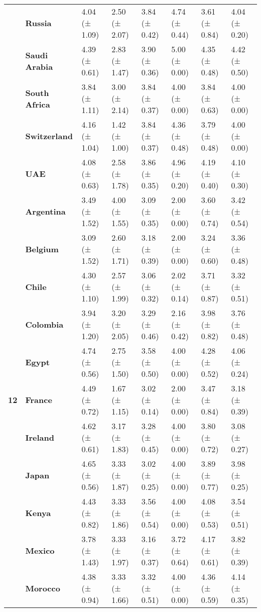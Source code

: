 \begin{longtable}{llllllll}
\textbf{} & \textbf{Russia} & 4.04 (± 1.09) & 2.50 (± 2.07) & 3.84 (± 0.42) & 4.74 (± 0.44) & 3.61 (± 0.84) & 4.04 (± 0.20) \\
\textbf{} & \textbf{Saudi Arabia} & 4.39 (± 0.61) & 2.83 (± 1.47) & 3.90 (± 0.36) & 5.00 (± 0.00) & 4.35 (± 0.48) & 4.42 (± 0.50) \\
\textbf{} & \textbf{South Africa} & 3.84 (± 1.11) & 3.00 (± 2.14) & 3.84 (± 0.37) & 4.00 (± 0.00) & 3.84 (± 0.63) & 4.00 (± 0.00) \\
\textbf{} & \textbf{Switzerland} & 4.16 (± 1.04) & 1.42 (± 1.00) & 3.84 (± 0.37) & 4.36 (± 0.48) & 3.79 (± 0.48) & 4.00 (± 0.00) \\
\textbf{} & \textbf{UAE} & 4.08 (± 0.63) & 2.58 (± 1.78) & 3.86 (± 0.35) & 4.96 (± 0.20) & 4.19 (± 0.40) & 4.10 (± 0.30) \\
\cline{1-8}
\multirow[t]{19}{*}{\textbf{12}} & \textbf{Argentina} & 3.49 (± 1.52) & 4.00 (± 1.55) & 3.09 (± 0.35) & 2.00 (± 0.00) & 3.60 (± 0.74) & 3.42 (± 0.54) \\
\textbf{} & \textbf{Belgium} & 3.09 (± 1.52) & 2.60 (± 1.71) & 3.18 (± 0.39) & 2.00 (± 0.00) & 3.24 (± 0.60) & 3.36 (± 0.48) \\
\textbf{} & \textbf{Chile} & 4.30 (± 1.10) & 2.57 (± 1.99) & 3.06 (± 0.32) & 2.02 (± 0.14) & 3.71 (± 0.87) & 3.32 (± 0.51) \\
\textbf{} & \textbf{Colombia} & 3.94 (± 1.20) & 3.20 (± 2.05) & 3.29 (± 0.46) & 2.16 (± 0.42) & 3.98 (± 0.82) & 3.76 (± 0.48) \\
\textbf{} & \textbf{Egypt} & 4.74 (± 0.56) & 2.75 (± 1.50) & 3.58 (± 0.50) & 4.00 (± 0.00) & 4.28 (± 0.52) & 4.06 (± 0.24) \\
\textbf{} & \textbf{France} & 4.49 (± 0.72) & 1.67 (± 1.15) & 3.02 (± 0.14) & 2.00 (± 0.00) & 3.47 (± 0.84) & 3.18 (± 0.39) \\
\textbf{} & \textbf{Ireland} & 4.62 (± 0.61) & 3.17 (± 1.83) & 3.28 (± 0.45) & 4.00 (± 0.00) & 3.80 (± 0.72) & 3.08 (± 0.27) \\
\textbf{} & \textbf{Japan} & 4.65 (± 0.56) & 3.33 (± 1.87) & 3.02 (± 0.25) & 4.00 (± 0.00) & 3.89 (± 0.77) & 3.98 (± 0.25) \\
\textbf{} & \textbf{Kenya} & 4.43 (± 0.82) & 3.33 (± 1.86) & 3.56 (± 0.54) & 4.00 (± 0.00) & 4.08 (± 0.53) & 3.54 (± 0.51) \\
\textbf{} & \textbf{Mexico} & 3.78 (± 1.43) & 3.33 (± 1.97) & 3.16 (± 0.37) & 3.72 (± 0.64) & 4.17 (± 0.61) & 3.82 (± 0.39) \\
\textbf{} & \textbf{Morocco} & 4.38 (± 0.94) & 3.33 (± 1.66) & 3.32 (± 0.51) & 4.00 (± 0.00) & 4.36 (± 0.59) & 4.14 (± 0.35) \\

\end{longtable}

